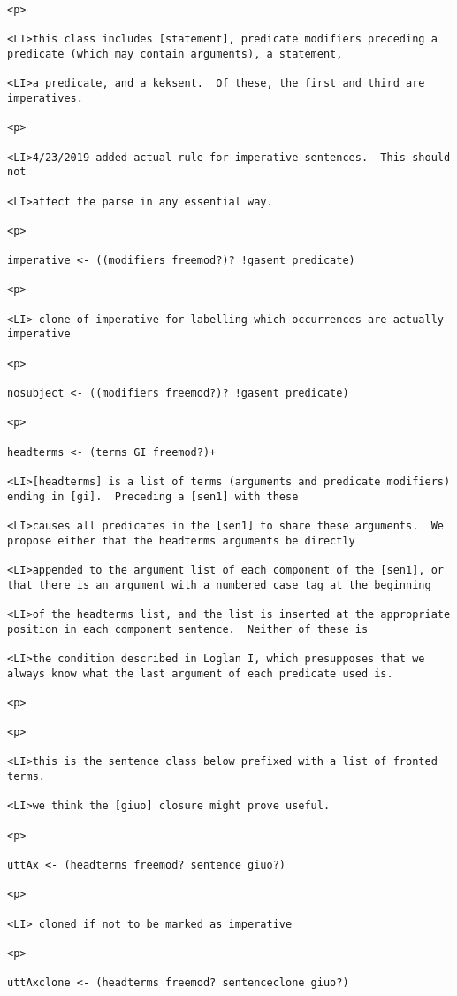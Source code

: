 \documentclass[12pt]{article}
\begin{document}
\begin{lstlisting}
<p>

<LI>this class includes [statement], predicate modifiers preceding a predicate (which may contain arguments), a statement,

<LI>a predicate, and a keksent.  Of these, the first and third are imperatives.

<p>

<LI>4/23/2019 added actual rule for imperative sentences.  This should not

<LI>affect the parse in any essential way.

<p>

imperative <- ((modifiers freemod?)? !gasent predicate)

<p>

<LI> clone of imperative for labelling which occurrences are actually imperative

<p>

nosubject <- ((modifiers freemod?)? !gasent predicate)

<p>

headterms <- (terms GI freemod?)+

<LI>[headterms] is a list of terms (arguments and predicate modifiers) ending in [gi].  Preceding a [sen1] with these

<LI>causes all predicates in the [sen1] to share these arguments.  We propose either that the headterms arguments be directly

<LI>appended to the argument list of each component of the [sen1], or that there is an argument with a numbered case tag at the beginning

<LI>of the headterms list, and the list is inserted at the appropriate position in each component sentence.  Neither of these is

<LI>the condition described in Loglan I, which presupposes that we always know what the last argument of each predicate used is.

<p>

<p>

<LI>this is the sentence class below prefixed with a list of fronted terms.

<LI>we think the [giuo] closure might prove useful.

<p>

uttAx <- (headterms freemod? sentence giuo?)

<p>

<LI> cloned if not to be marked as imperative

<p>

uttAxclone <- (headterms freemod? sentenceclone giuo?)


\end{lstlisting}
\end{document}

